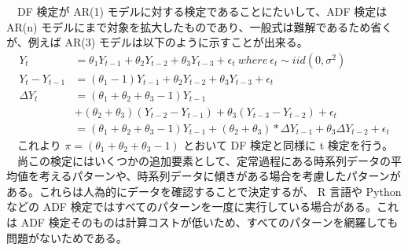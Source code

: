 \documentclass{scrartcl}
\begin{document}
　DF 検定が AR(1) モデルに対する検定であることにたいして、ADF 検定は AR(n) モデルにまで対象を拡大したものであり、一般式は難解であるため省くが、例えば AR(3) モデルは以下のように示すことが出来る。\\
   \begin{align}
   Y_t &= \theta_1 Y_{t-1} + \theta_2 Y_{t-2} + \theta_3  Y_{t-3} + \epsilon_t \ where \ \epsilon_t \sim iid(0,\sigma^2) \\
   Y_t - Y_{t-1} &= (\theta_1 - 1) Y_{t-1} + \theta_2  Y_{t-2} + \theta_3  Y_{t-3} + \epsilon_t \\
   \Delta Y_t &= (\theta_1 + \theta_2 + \theta_3 - 1)  Y_{t-1} \nonumber \\
&+ (\theta_2 + \theta_3) (Y_{t-2} - Y_{t-1}) + \theta_3 (Y_{t-3} - Y_{t-2}) + \epsilon_t \nonumber \\
&= (\theta_1 + \theta_2 + \theta_3 - 1) Y_{t-1} + (\theta_2 + \theta_3) * \Delta Y_{t-1} + \theta_3 \Delta Y_{t-2} + \epsilon_t
   \end{align}
　これより \(\pi = (\theta_1 + \theta_2 + \theta_3 - 1)\) とおいて DF 検定と同様に t 検定を行う。\\
　尚この検定にはいくつかの追加要素として、定常過程にある時系列データの平均値を考えるパターンや、時系列データに傾きがある場合を考慮したパターンがある。これらは人為的にデータを確認することで決定するが、 R 言語や Python などの ADF 検定ではすべてのパターンを一度に実行している場合がある。これは ADF 検定そのものは計算コストが低いため、すべてのパターンを網羅しても問題がないためである。\\
\end{document}
